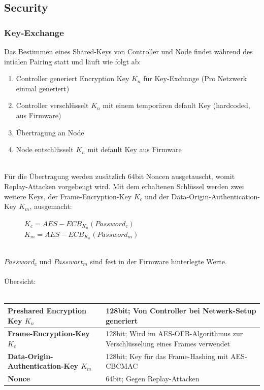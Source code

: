 \documentclass[a4paper,11pt]{article}
\begin{document}
\subsection*{Security}
\subsubsection*{Key-Exchange}
Das Bestimmen eines Shared-Keys von Controller und Node findet während des intialen Pairing statt und läuft wie folgt ab:
\begin{enumerate}
	\item Controller generiert Encryption Key $K_{n}$ für Key-Exchange (Pro Netzwerk einmal generiert)
	\item Controller verschlüsselt $K_{n}$ mit einem temporären default Key (hardcoded, aus Firmware)
	\item Übertragung an Node
	\item Node entschlüsselt $K_{n}$ mit default Key aus Firmware
\end{enumerate}~\\
Für die Übertragung werden zusätzlich 64bit Noncen ausgetauscht, womit Replay-Attacken vorgebeugt wird.
Mit dem erhaltenen Schlüssel werden zwei weitere Keys, der Frame-Encryption-Key $K_{c}$ und der Data-Origin-Authentication-Key $K_{m}$, ausgemacht:
\begin{figure}[h!t]
	\centering
	\large
	$K_{c} = AES-ECB_{K_{n}}(Password_{c})$\\
	$K_{m} = AES-ECB_{K_{n}}(Password_{m})$
\end{figure}~\\
$Password_{c}$ und $Passwort_{m}$ sind fest in der Firmware hinterlegte Werte.
\\\\
Übersicht:\\\\
\begin{tabular}{| p{6cm} | p{8cm} |}
	\hline
	\textbf{Preshared Encryption Key $K_{n}$} & 128bit; Von Controller bei Netwerk-Setup generiert\\\hline
	\textbf{Frame-Encryption-Key $K_{c}$} & 128bit; Wird im AES-OFB-Algorithmus zur Verschlüsselung eines Frames verwendet\\\hline
	\textbf{Data-Origin-Authentication-Key $K_{m}$} & 128bit; Key für das Frame-Hashing mit AES-CBCMAC\\\hline
	\textbf{Nonce} & 64bit; Gegen Replay-Attacken\\\hline
\end{tabular}~\newpage
\end{document}
